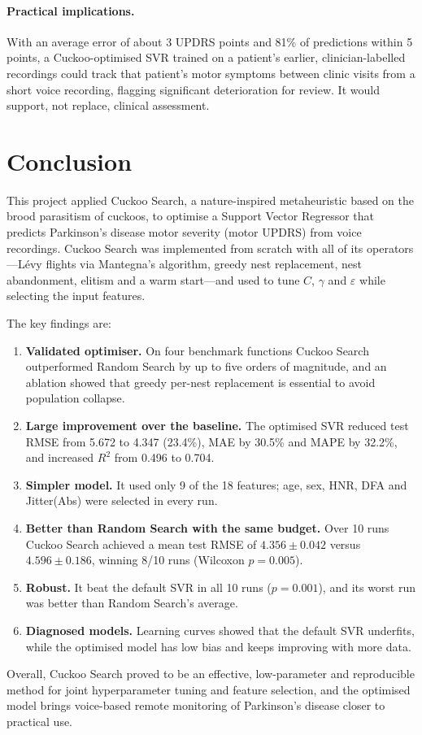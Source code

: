 \documentclass[12pt,a4paper]{article}
\numberwithin{equation}{section}
\numberwithin{table}{section}
\numberwithin{figure}{section}
\begin{document}
\paragraph{Practical implications.} With an average error of about 3 UPDRS points and 81\% of predictions within 5 points, a Cuckoo-optimised SVR trained on a patient's earlier, clinician-labelled recordings could track that patient's motor symptoms between clinic visits from a short voice recording, flagging significant deterioration for review. It would support, not replace, clinical assessment.

\section{Conclusion}\label{sec:conclusion}

This project applied Cuckoo Search, a nature-inspired metaheuristic based on the brood parasitism of cuckoos, to optimise a Support Vector Regressor that predicts Parkinson's disease motor severity (motor UPDRS) from voice recordings. Cuckoo Search was implemented from scratch with all of its operators---Lévy flights via Mantegna's algorithm, greedy nest replacement, nest abandonment, elitism and a warm start---and used to tune $C$, $\gamma$ and $\varepsilon$ while selecting the input features.

The key findings are:
\begin{enumerate}
  \item \textbf{Validated optimiser.} On four benchmark functions Cuckoo Search outperformed Random Search by up to five orders of magnitude, and an ablation showed that greedy per-nest replacement is essential to avoid population collapse.
  \item \textbf{Large improvement over the baseline.} The optimised SVR reduced test RMSE from 5.672 to 4.347 (23.4\%), MAE by 30.5\% and MAPE by 32.2\%, and increased $R^2$ from 0.496 to 0.704.
  \item \textbf{Simpler model.} It used only 9 of the 18 features; age, sex, HNR, DFA and Jitter(Abs) were selected in every run.
  \item \textbf{Better than Random Search with the same budget.} Over 10 runs Cuckoo Search achieved a mean test RMSE of $4.356 \pm 0.042$ versus $4.596 \pm 0.186$, winning 8/10 runs (Wilcoxon $p = 0.005$).
  \item \textbf{Robust.} It beat the default SVR in all 10 runs ($p = 0.001$), and its worst run was better than Random Search's average.
  \item \textbf{Diagnosed models.} Learning curves showed that the default SVR underfits, while the optimised model has low bias and keeps improving with more data.
\end{enumerate}
Overall, Cuckoo Search proved to be an effective, low-parameter and reproducible method for joint hyperparameter tuning and feature selection, and the optimised model brings voice-based remote monitoring of Parkinson's disease closer to practical use.
\end{document}
